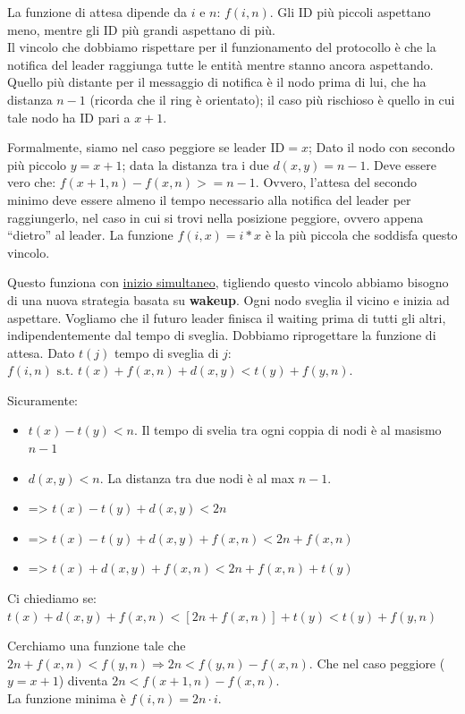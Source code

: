 La funzione di attesa dipende da $i$ e $n$: $f(i, n)$. Gli ID più piccoli aspettano meno, mentre gli ID più grandi aspettano di più. \\
Il vincolo che dobbiamo rispettare per il funzionamento del protocollo è che la notifica del leader raggiunga tutte le entità mentre
stanno ancora aspettando. Quello più distante per il messaggio di notifica è il nodo prima di lui, che ha distanza $n-1$
(ricorda che il ring è orientato); il caso più rischioso è quello in cui tale nodo ha ID pari a $x+1$.

Formalmente, siamo nel caso peggiore se leader $\text{ID} = x$; Dato il nodo con secondo più piccolo $y = x+1$; data la distanza tra i due
$d(x, y) = n-1$.
Deve essere vero che: $f(x+1, n) - f(x, n) >= n-1$. Ovvero, l'attesa del secondo minimo deve essere almeno il tempo necessario alla notifica
del leader per raggiungerlo, nel caso in cui si trovi nella posizione peggiore, ovvero appena ``dietro'' al leader.
La funzione $f(i, x) = i*x$ è la più piccola che soddisfa questo vincolo.

Questo funziona con \underline{inizio simultaneo}, tigliendo questo vincolo abbiamo bisogno di una nuova strategia basata su \textbf{wakeup}.
Ogni nodo sveglia il vicino e inizia ad aspettare. Vogliamo che il futuro leader finisca il waiting prima di tutti gli altri,
indipendentemente dal tempo di sveglia. Dobbiamo riprogettare la funzione di attesa.
Dato $t(j)$ tempo di sveglia di $j$: $f(i, n) \text{ s.t. } t(x) + f(x, n) + d(x, y) < t(y) + f(y, n)$.

Sicuramente:
\begin{itemize}
  \item $t(x) - t(y) < n$. Il tempo di svelia tra ogni coppia di nodi è al masismo $n-1$
  \item $d(x, y) < n$. La distanza tra due nodi è al max $n-1$.
  \item => $t(x) - t(y) + d(x, y) < 2n$
  \item => $t(x) - t(y) + d(x, y) + f(x, n) < 2n + f(x, n)$
  \item => $t(x) + d(x, y) + f(x, n) < 2n + f(x, n) + t(y)$
\end{itemize}

Ci chiediamo se: $t(x) + d(x, y) + f(x, n) < [2n + f(x, n)] + t(y) < t(y) + f(y, n)$

Cerchiamo una funzione tale che $2n + f(x, n) < f(y, n) \Rightarrow 2n < f(y, n) - f(x, n)$. Che nel caso peggiore ($y=x+1$) diventa $2n < f(x+1, n) - f(x, n)$.\\
La funzione minima è $f(i, n) = 2n \cdot i$.

